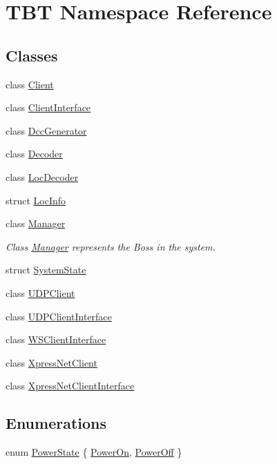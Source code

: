 \hypertarget{namespaceTBT}{}\section{T\+BT Namespace Reference}
\label{namespaceTBT}
\subsection*{Classes}
\begin{DoxyCompactItemize}
\item 
class \hyperlink{classTBT_1_1Client}{Client}
\item 
class \hyperlink{classTBT_1_1ClientInterface}{Client\+Interface}
\item 
class \hyperlink{classTBT_1_1DccGenerator}{Dcc\+Generator}
\item 
class \hyperlink{classTBT_1_1Decoder}{Decoder}
\item 
class \hyperlink{classTBT_1_1LocDecoder}{Loc\+Decoder}
\item 
struct \hyperlink{structTBT_1_1LocInfo}{Loc\+Info}
\item 
class \hyperlink{classTBT_1_1Manager}{Manager}
\begin{DoxyCompactList}\small\item\em Class \hyperlink{classTBT_1_1Manager}{Manager} represents \textquotesingle{}the Boss\textquotesingle{} in the system. \end{DoxyCompactList}\item 
struct \hyperlink{structTBT_1_1SystemState}{System\+State}
\item 
class \hyperlink{classTBT_1_1UDPClient}{U\+D\+P\+Client}
\item 
class \hyperlink{classTBT_1_1UDPClientInterface}{U\+D\+P\+Client\+Interface}
\item 
class \hyperlink{classTBT_1_1WSClientInterface}{W\+S\+Client\+Interface}
\item 
class \hyperlink{classTBT_1_1XpressNetClient}{Xpress\+Net\+Client}
\item 
class \hyperlink{classTBT_1_1XpressNetClientInterface}{Xpress\+Net\+Client\+Interface}
\end{DoxyCompactItemize}
\subsection*{Enumerations}
\begin{DoxyCompactItemize}
\item 
enum \hyperlink{namespaceTBT_a05cc33b74a68fb6eaf5962b5979716d4_a05cc33b74a68fb6eaf5962b5979716d4}{Power\+State} \{ \hyperlink{namespaceTBT_a05cc33b74a68fb6eaf5962b5979716d4_a05cc33b74a68fb6eaf5962b5979716d4a7f5f78db5644978b8cb2604877141abb}{Power\+On}, 
\hyperlink{namespaceTBT_a05cc33b74a68fb6eaf5962b5979716d4_a05cc33b74a68fb6eaf5962b5979716d4a9e3c943b1f180e12dc8446b56ee86467}{Power\+Off}
 \}
\end{DoxyCompactItemize}
